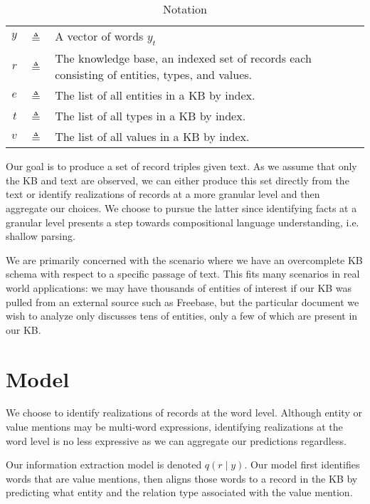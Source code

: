 \documentclass[12pt]{article}
\begin{document}
\begin{table}[htbp]\caption{Notation}
\centering %
\begin{tabular}{r c p{10cm} }
\toprule
$y$ & $\triangleq$ & A vector of words $y_t$\\
$r$ & $\triangleq$ & The knowledge base,
    an indexed set of records each consisting of entities, types, and values.\\
$e$ & $\triangleq$ & The list of all entities in a KB by index.\\
$t$ & $\triangleq$ & The list of all types in a KB by index.\\
$v$ & $\triangleq$ & The list of all values in a KB by index.\\
\bottomrule
\end{tabular}
\label{tab:TableOfNotationForMyResearch}
\end{table}

Our goal is to produce a set of record triples given text.
As we assume that only the KB and text are observed,
we can either produce this set directly from the text or identify realizations of
records at a more granular level and then aggregate our choices.
We choose to pursue the latter since identifying facts at a granular level
presents a step towards compositional language understanding,
i.e. shallow parsing.

We are primarily concerned with the scenario where we have an overcomplete KB schema with
respect to a specific passage of text.
This fits many scenarios in real world applications:
we may have thousands of entities of interest if our KB was pulled from an 
external source such as Freebase,
but the particular document we wish to analyze only discusses tens of entities,
only a few of which are present in our KB.

\section{Model}
We choose to identify realizations of records at the word level.
Although entity or value mentions may be multi-word expressions,
identifying realizations at the word level is no less expressive as
we can aggregate our predictions regardless.

Our information extraction model is denoted $q(r \mid y)$.
Our model first identifies words that are value mentions,
then aligns those words to a record in the KB by predicting what
entity and the relation type associated with the value mention.
\end{document}
